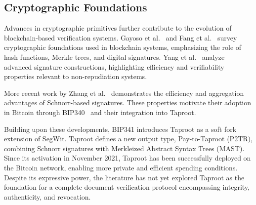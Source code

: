 \begin{table}[h]
    \centering
    \caption{Comparison of Bitcoin-based data anchoring techniques}
    \label{tab:comparativeBitcoin}
\end{table}

\subsection{Cryptographic Foundations}

Advances in cryptographic primitives further contribute to the evolution of blockchain-based verification systems.
Gayoso et al.~\cite{Gayoso2020AnalysisCryptographic} and Fang et al.~\cite{Fang2020DigitalSignature} survey cryptographic foundations used in blockchain systems, emphasizing the role of hash functions, Merkle trees, and digital signatures.
Yang et al.~\cite{Yang2022EfficientVerifiablyEncrypted} analyze advanced signature constructions, highlighting efficiency and verifiability properties relevant to non-repudiation systems.

More recent work by Zhang et al.~\cite{Zhang2025HighEfficiencySchnorrMultiSignature} demonstrates the efficiency and aggregation advantages of Schnorr-based signatures.
These properties motivate their adoption in Bitcoin through BIP340~\cite{bip340} and their integration into Taproot.

Building upon these developments, BIP341 introduces Taproot as a soft fork extension of SegWit.
Taproot defines a new output type, Pay-to-Taproot (P2TR), combining Schnorr signatures with Merkleized Abstract Syntax Trees (MAST).
Since its activation in November 2021, Taproot has been successfully deployed on the Bitcoin network, enabling more private and efficient spending conditions.
Despite its expressive power, the literature has not yet explored Taproot as the foundation for a complete document verification protocol encompassing integrity, authenticity, and revocation.


